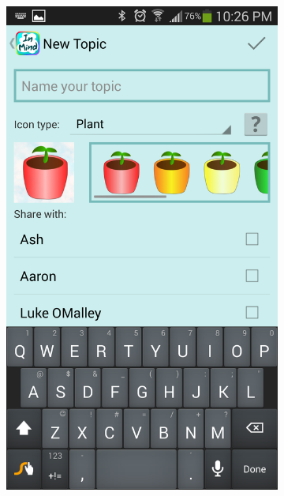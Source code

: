     \begin{figure}
      \caption[Creation View]{\textbf{Creation View} --
          (a) Topic creation involves naming the topic,
          choosing the icon type,
          and choosing whom to share the topic with.
          (b) A dropdown menu allows users to choose which icon
          represents the topic.}
      \centering
      \begin{subfigure}[b]{0.4\textwidth}
        \includegraphics[width=\textwidth]{topic_create.png}

\end{subfigure}
\end{figure}
